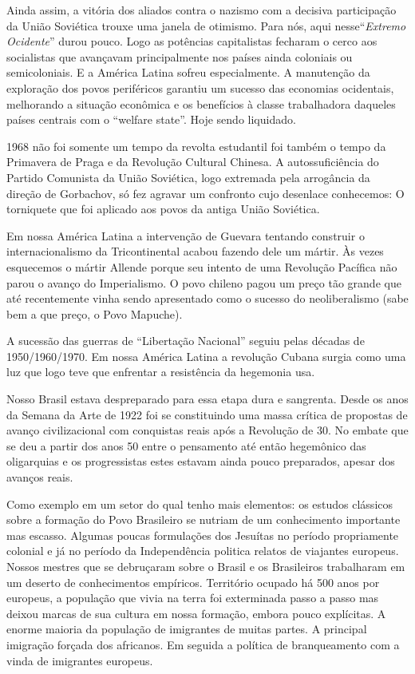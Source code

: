 Ainda assim, a vitória dos aliados contra o nazismo com a decisiva
participação da União Soviética trouxe uma janela de otimismo. Para nós,
aqui nesse“{\it Extremo Ocidente}” durou pouco. Logo as potências
capitalistas fecharam o cerco aos socialistas que avançavam
principalmente nos países ainda coloniais ou semicoloniais. E a América
Latina sofreu especialmente. A manutenção da exploração dos povos
periféricos garantiu um sucesso das economias ocidentais, melhorando a
situação econômica e os benefícios à classe trabalhadora daqueles países
centrais com o “welfare state”. Hoje sendo liquidado.

1968 não foi somente um tempo da revolta estudantil foi também o tempo
da Primavera de Praga e da Revolução Cultural Chinesa. A
autossuficiência do Partido Comunista da União Soviética, logo extremada
pela arrogância da direção de Gorbachov, só fez agravar um confronto
cujo desenlace conhecemos: O torniquete que foi aplicado aos povos da
antiga União Soviética.

Em nossa América Latina a intervenção de Guevara tentando construir o
internacionalismo da Tricontinental acabou fazendo dele um mártir. Às
vezes esquecemos o mártir Allende porque seu intento de uma Revolução
Pacífica não parou o avanço do Imperialismo. O povo chileno pagou um
preço tão grande que até recentemente vinha sendo apresentado como o
sucesso do neoliberalismo (sabe bem a que preço, o Povo Mapuche).

A sucessão das guerras de “Libertação Nacional” seguiu pelas décadas de
1950/1960/1970. Em nossa América Latina a revolução Cubana surgia como
uma luz que logo teve que enfrentar a resistência da hegemonia {\sc usa}.

Nosso Brasil estava despreparado para essa etapa dura e sangrenta. Desde
os anos da Semana da Arte de 1922 foi se constituindo uma massa crítica
de propostas de avanço civilizacional com conquistas reais após a
Revolução de 30. No embate que se deu a partir dos anos 50 entre o
pensamento até então hegemônico das oligarquias e os progressistas estes
estavam ainda pouco preparados, apesar dos avanços reais.

Como exemplo em um setor do qual tenho mais elementos: os estudos
clássicos sobre a formação do Povo Brasileiro se nutriam de um
conhecimento importante mas escasso. Algumas poucas formulações dos
Jesuítas no período propriamente colonial e já no período da
Independência politica relatos de viajantes europeus. Nossos mestres que
se debruçaram sobre o Brasil e os Brasileiros trabalharam em um deserto
de conhecimentos empíricos. Território ocupado há 500 anos por europeus,
a população que vivia na terra foi exterminada passo a passo mas deixou
marcas de sua cultura em nossa formação, embora pouco explícitas. A
enorme maioria da população de imigrantes de muitas partes. A principal
imigração forçada dos africanos. Em seguida a política de branqueamento
com a vinda de imigrantes europeus.

